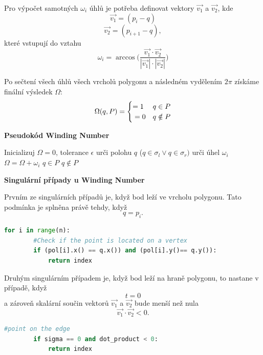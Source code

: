 Pro výpočet samotných $\omega_i$ úhlů je potřeba definovat vektory $\vec{v_1}$ a $\vec{v_2}$, kde
\[ \vec{v_1} = (p_i - q) 
\]
\[ \vec{v_2} = (p_{i+1} - q),
\]
které vstupují do vztahu 
\[ \omega_i = \arccos \biggl(\frac{\vec{v_1}\cdot\vec{v_2}}{|\vec{v_1}|\cdot|\vec{v_2}|}\biggl)
\]


Po sečtení všech úhlů všech vrcholů polygonu a následném vydělením $2\pi$ získáme finální výsledek $\Omega$:
\[
  \Omega (q, P)  = \begin{cases}
    =1 & { q \in P } \\
    \newline
    =0 & { q \notin P}
  \end{cases}
\]

\textbf{Pseudokód Winding Number}
\begin{algorithm}
\caption{Winding Number}
\label{alg:win_number}
\begin{algorithmic}[1]
\State Inicializuj $\Omega = 0$, tolerance $\epsilon$ 
    \State urči polohu $q$ ($q \in \sigma_l  \vee  q \in \sigma_r) $
    \State urči úhel $\omega_i $
     
        \State $\Omega = \Omega + \omega_i $ 
    \Else {} 
        \EndIf
\EndFor
\If{$ ||\Omega| - 2\pi| < \epsilon $} 
    \State \Return $q \in P$
\Else
    \State \Return $q \notin P$
\EndIf
\end{algorithmic}
\end{algorithm}


\newpage
\textbf{Singulární případy u Winding Number}

Prvním ze singulárních případů je, když bod leží ve vrcholu polygonu. 
Tato podmínka je splněna právě tehdy, když 
\[
q = p_i.
\]

\begin{lstlisting}[language=Python, caption = Ošetření v kódu]
    for i in range(n):
        #Check if the point is located on a vertex
        if (pol[i].x() == q.x()) and (pol[i].y()== q.y()):
            return index

\end{lstlisting}


Druhým singulárním případem je, když bod leží na hraně polygonu, to nastane v případě, když 
\[
t = 0
\]
a zároveň skalární součin vektorů $\vec{
v_1}$ a $\vec{v_2}$ bude menší než nula
\[
\vec{v_1} \cdot \vec{v_2} < 0.
\]

\begin{lstlisting}[language=Python, caption = Ošetření v kódu]
    #point on the edge
        if sigma == 0 and dot_product < 0:
            return index
\end{lstlisting}

